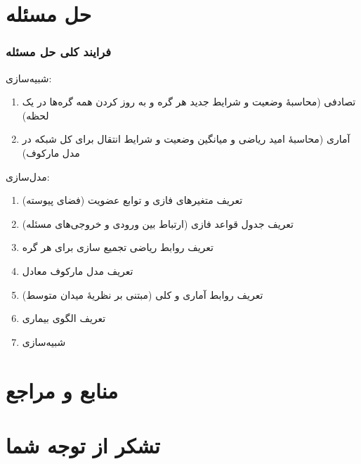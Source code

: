 \documentclass[xcolor=dvipsnames, professionalfonts, aspectratio=169, 11pt]{beamer}
\begin{document}
\section{حل مسئله}
\begin{frame}
    \frametitle{فرایند کلی حل مسئله}
    {
        شبیه‌سازی:
        \begin{enumerate}\RTList
            \item<-1> تصادفی (محاسبهٔ وضعیت و شرایط جدید هر گره و به روز کردن همه گره‌ها در یک لحظه)
            \item<2-> آماری (محاسبهٔ امید ریاضی و میانگین وضعیت و شرایط انتقال برای کل شبکه در مدل مارکوف)

        \end{enumerate}

        مدل‌سازی:
        \begin{enumerate}\RTList
            \item تعریف متغیرهای فازی و توابع عضویت (فضای پیوسته)
            \item تعریف جدول قواعد فازی (ارتباط بین ورودی و خروجی‌های مسئله)
            \item تعریف روابط ریاضی تجمیع سازی برای هر گره
            \item<2-> تعریف مدل مارکوف معادل
            \item<2-> تعریف روابط آماری و کلی (مبتنی بر نظریهٔ میدان متوسط)
            \item<1> تعریف الگوی بیماری
            \item شبیه‌سازی

        \end{enumerate}
    }
\end{frame}

\section{منابع و مراجع}
\begin{frame}
    \begin{latin}
        \scriptsize
        
    \end{latin}

\end{frame}

\section[تشکر]{تشکر از توجه شما}
\end{document}
